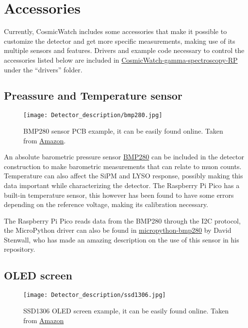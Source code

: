 \section{Accessories}

Currently, CosmicWatch includes some accessories that make it possible to customize the detector and get more specific measurements, making use of its multiple sensors and features. Drivers and example code necessary to control the accessories listed below are included in \href{https://github.com/anvargasl/CosmicWatch-gamma-spectroscopy-RP}{CosmicWatch-gamma-spectroscopy-RP} under the ``drivers'' folder.

\subsection{Preassure and Temperature sensor}

\begin{figure}[H]
  \centering
  \texttt{[image: Detector\_description/bmp280.jpg]}
  \caption{BMP280 sensor PCB example, it can be easily found online. Taken from \href{https://a.co/d/hhF7Vtp}{Amazon}.}
  \label{fig:bmp280}
\end{figure}

An absolute barometric pressure sensor \href{https://www.bosch-sensortec.com/products/environmental-sensors/pressure-sensors/bmp280/}{BMP280} can be included in the detector construction to make barometric measurements that can relate to muon counts. Temperature can also affect the SiPM and LYSO response, possibly making this data important while characterizing the detector. The Raspberry Pi Pico has a built-in temperature sensor, this however has been found to have some errors depending on the reference voltage, making its calibration necessary.

The Raspberry Pi Pico reads data from the BMP280 through the I2C protocol, the MicroPython driver can also be found in \href{https://github.com/dafvid/micropython-bmp280}{micropython-bmp280} by David Stenwall, who has made an amazing description on the use of this sensor in his repository.

\subsection{OLED screen}

\begin{figure}[H]
  \centering
  \texttt{[image: Detector\_description/ssd1306.jpg]}
  \caption{SSD1306 OLED screen example, it can be easily found online. Taken from \href{https://a.co/d/cGnBDLF}{Amazon}}
  \label{fig:bssd1306}
\end{figure}

